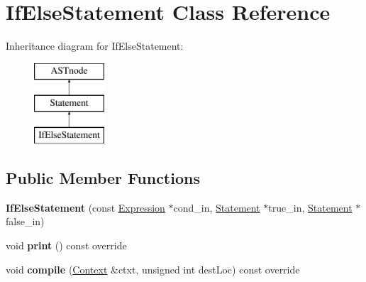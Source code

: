 \hypertarget{class_if_else_statement}{}\section{If\+Else\+Statement Class Reference}
\label{class_if_else_statement}
Inheritance diagram for If\+Else\+Statement\+:\begin{figure}[H]
\begin{center}
\leavevmode
\includegraphics[height=3.000000cm]{class_if_else_statement}
\end{center}
\end{figure}
\subsection*{Public Member Functions}
\begin{DoxyCompactItemize}
\item 
\mbox{\label{class_if_else_statement_a1838077ebc90cfc5309fe0e2acad5d16}} 
{\bfseries If\+Else\+Statement} (const \hyperlink{class_expression}{Expression} $\ast$cond\+\_\+in, \hyperlink{class_statement}{Statement} $\ast$true\+\_\+in, \hyperlink{class_statement}{Statement} $\ast$false\+\_\+in)
\item 
\mbox{\label{class_if_else_statement_accdfdb47988512747590e9e59e02ebb4}} 
void {\bfseries print} () const override
\item 
\mbox{\label{class_if_else_statement_aac0dfb69c60bcb532e09030ef500ad0b}} 
void {\bfseries compile} (\hyperlink{class_context}{Context} \&ctxt, unsigned int dest\+Loc) const override
\end{DoxyCompactItemize}
